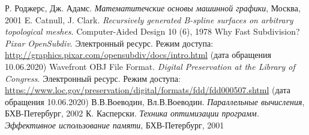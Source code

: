 \documentclass[14pt]{extarticle}
\begin{document}
\newpage
{}
\begin{thebibliography}{9}
 Р. Роджерс, Дж. Адамс. \textit{Математитечские основы машинной графики}, Москва, 2001
    E. Catnull, J. Clark. \textit{Recursively generated B-spline surfaces on arbitrary topological meshes}. Computer-Aided Design 10 (6), 1978
 Why Fast Subdivision? \textit{Pixar OpenSubdiv}. Электронный ресурс. Режим доступа: \url{http://graphics.pixar.com/opensubdiv/docs/intro.html} (дата обращения 10.06.2020)
 Wavefront OBJ File Format. \textit{Digital Preservation at the Library of Congress}. Электронный ресурс. Режим доступа: \url{https://www.loc.gov/preservation/digital/formats/fdd/fdd000507.shtml} (дата обращения 10.06.2020)
 В.В.Воеводин, Вл.В.Воеводин. \textit{Параллельные вычисления}, БХВ-Петербург, 2002
 К. Касперски. \textit{Техника оптимизации программ. Эффективное использование памяти}, БХВ-Петербург, 2001
\end{thebibliography}
\end{document}
